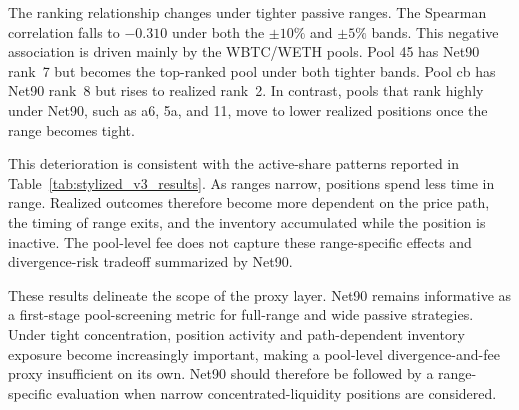 \documentclass[10pt,conference,compsocconf]{IEEEtran}
\begin{document}
The ranking relationship changes under tighter passive ranges. The Spearman correlation falls to $-0.310$ under both the $\pm10\%$ and $\pm5\%$ bands. This negative association is driven mainly by the WBTC/WETH pools. Pool 45 has Net90 rank~7 but becomes the top-ranked pool under both tighter bands. Pool cb has Net90 rank~8 but rises to realized rank~2. In contrast, pools that rank highly under Net90, such as a6, 5a, and 11, move to lower realized positions once the range becomes tight.

This deterioration is consistent with the active-share patterns reported in Table~\ref{tab:stylized_v3_results}. As ranges narrow, positions spend less time in range. Realized outcomes therefore become more dependent on the price path, the timing of range exits, and the inventory accumulated while the position is inactive. The pool-level fee does not capture these range-specific effects and divergence-risk tradeoff summarized by Net90.

These results delineate the scope of the proxy layer. Net90 remains informative as a first-stage pool-screening metric for full-range and wide passive strategies. Under tight concentration, position activity and path-dependent inventory exposure become increasingly important, making a pool-level divergence-and-fee proxy insufficient on its own. Net90 should therefore be followed by a range-specific evaluation when narrow concentrated-liquidity positions are considered.
\end{document}
